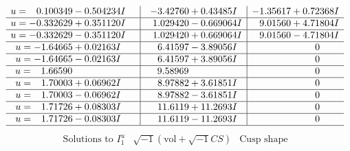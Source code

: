 \documentclass[1p]{elsarticle_modified}
\theoremstyle{definition}
\newcommand{\I}{\sqrt{-1}}
\begin{document}
$$\begin{array}{c|c|c}
\begin{aligned}
u &= \phantom{-}0.100349 - 0.504234 I\end{aligned}
 & -3.42760 + 0.43485 I & -1.35617 + 0.72368 I \\ \hline\begin{aligned}
u &= -0.332629 + 0.351120 I\end{aligned}
 & \phantom{-}1.029420 - 0.669064 I & \phantom{-}9.01560 + 4.71804 I \\ \hline\begin{aligned}
u &= -0.332629 - 0.351120 I\end{aligned}
 & \phantom{-}1.029420 + 0.669064 I & \phantom{-}9.01560 - 4.71804 I \\ \hline\begin{aligned}
u &= -1.64665 + 0.02163 I\end{aligned}
 & \phantom{-}6.41597 - 3.89056 I & \phantom{-0.000000 } 0 \\ \hline\begin{aligned}
u &= -1.64665 - 0.02163 I\end{aligned}
 & \phantom{-}6.41597 + 3.89056 I & \phantom{-0.000000 } 0 \\ \hline\begin{aligned}
u &= \phantom{-}1.66590\phantom{ +0.000000I}\end{aligned}
 & \phantom{-}9.58969\phantom{ +0.000000I} & \phantom{-0.000000 } 0 \\ \hline\begin{aligned}
u &= \phantom{-}1.70003 + 0.06962 I\end{aligned}
 & \phantom{-}8.97882 + 3.61851 I & \phantom{-0.000000 } 0 \\ \hline\begin{aligned}
u &= \phantom{-}1.70003 - 0.06962 I\end{aligned}
 & \phantom{-}8.97882 - 3.61851 I & \phantom{-0.000000 } 0 \\ \hline\begin{aligned}
u &= \phantom{-}1.71726 + 0.08303 I\end{aligned}
 & \phantom{-}11.6119 + 11.2693 I & \phantom{-0.000000 } 0 \\ \hline\begin{aligned}
u &= \phantom{-}1.71726 - 0.08303 I\end{aligned}
 & \phantom{-}11.6119 - 11.2693 I & \phantom{-0.000000 } 0\\
 \hline 
 \end{array}$$\newpage$$\begin{array}{c|c|c}  
\text{Solutions to }I^u_{1}& \I (\text{vol} + \sqrt{-1}CS) & \text{Cusp shape}\\

\end{array}$$
\end{document}

